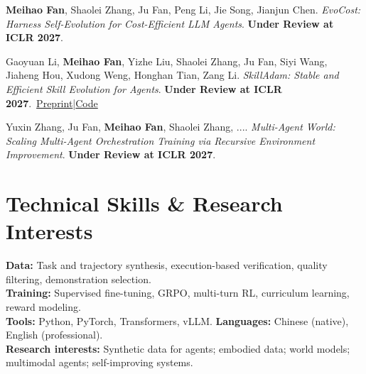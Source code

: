 \documentclass[a4paper,10pt]{article}
\newcommand{\pub}[4]{\item #1. \textit{#2}. \textbf{#3}.\ #4}
\begin{document}
\begin{enumerate}[leftmargin=18pt,label={[U\arabic*]},itemsep=3pt,topsep=1pt,parsep=0pt]

\pub{\textbf{Meihao Fan}, Shaolei Zhang, Ju Fan, Peng Li, Jie Song, Jianjun Chen}
{EvoCost: Harness Self-Evolution for Cost-Efficient LLM Agents}
{Under Review at ICLR 2027}
{}

\pub{Gaoyuan Li, \textbf{Meihao Fan}, Yizhe Liu, Shaolei Zhang, Ju Fan, Siyi Wang, Jiaheng Hou, Xudong Weng, Honghan Tian, Zang Li}
{SkillAdam: Stable and Efficient Skill Evolution for Agents}
{Under Review at ICLR 2027}
{\href{https://arxiv.org/abs/2609.08944}{Preprint}\;|\;\href{https://github.com/ruc-datalab/SkillAdam}{Code}}


\pub{Yuxin Zhang, Ju Fan, \textbf{Meihao Fan}, Shaolei Zhang, ...}
{Multi-Agent World: Scaling Multi-Agent Orchestration Training via Recursive Environment Improvement}
{Under Review at ICLR 2027}
{}
\end{enumerate}

\section{Technical Skills \& Research Interests}

\textbf{Data:}
Task and trajectory synthesis, execution-based verification, quality filtering, demonstration selection.\\

\textbf{Training:}
Supervised fine-tuning, GRPO, multi-turn RL, curriculum learning, reward modeling.\\

\textbf{Tools:}
Python, PyTorch, Transformers, vLLM.\quad
\textbf{Languages:}
Chinese (native), English (professional).\\

\textbf{Research interests:}
Synthetic data for agents; embodied data; world models; multimodal agents; self-improving systems.
\end{document}

